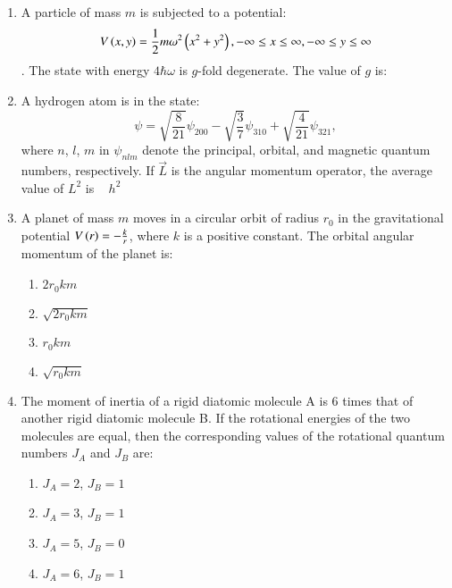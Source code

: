 \documentclass[journal,9pt,onecolumn]{IEEEtran}
\begin{document}
\begin{enumerate}
\item A particle of mass $m$ is subjected to a potential: $$V \left(x, y\right) = \frac{1}{2} m \omega^2  \left(x^2 + y^2\right), -\infty \leq x \leq \infty, -\infty \leq y \leq \infty$$. The state with energy $4\hbar \omega$ is $g$-fold degenerate. The value of $g$ is:


\item A hydrogen atom is in the state: $$\psi = \sqrt{\frac{8}{21}} \psi_{200} - \sqrt{\frac{3}{7}} \psi_{310} + \sqrt{\frac{4}{21}} \psi_{321},$$ where $n$, $l$, $m$ in $\psi_{n l m}$ denote the principal, orbital, and magnetic quantum numbers, respectively. If $\overrightarrow{L}$ is the angular momentum operator, the average value of $ L^2$ is \,\,\,\,\,$h^2$

    
\item A planet of mass $m$ moves in a circular orbit of radius $r_0$ in the gravitational potential $V \left(r\right) = -\frac{k}{r}$, where $k$ is a positive constant. The orbital angular momentum of the planet is:

\begin{multicols}{4}
\begin{enumerate}
    \item $2 r_0 k m$
    \item $\sqrt{2 r_0 k m}$
    \item $r_0 k m$
    \item $\sqrt{r_0 k m}$
\end{enumerate}
\end{multicols}

    
\item The moment of inertia of a rigid diatomic molecule A is 6 times that of another rigid diatomic molecule B. If the rotational energies of the two molecules are equal, then the corresponding values of the rotational quantum numbers $J_A$ and $J_B$ are:

\begin{multicols}{2}
\begin{enumerate}
    \item $J_A = 2$, $J_B = 1$
    \item $J_A = 3$, $J_B = 1$
    \item $J_A = 5$, $J_B = 0$
    \item $J_A = 6$, $J_B = 1$
\end{enumerate}
\end{multicols}




\end{enumerate}
\end{document}
